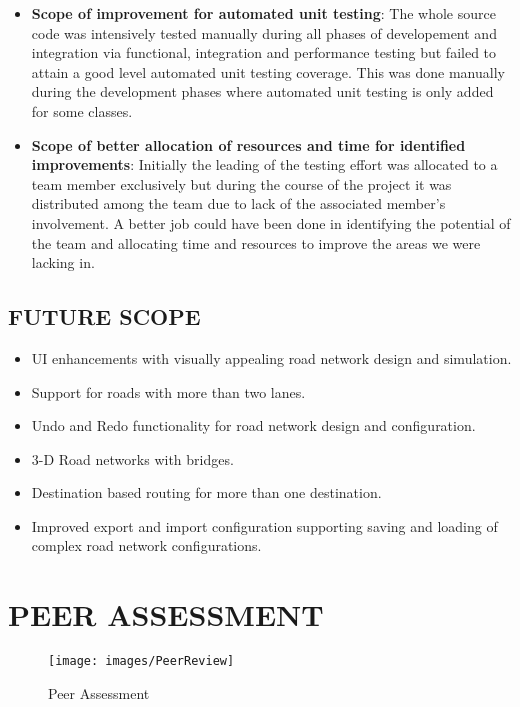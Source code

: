 \documentclass[11pt,a4paper]{article}
\begin{document}
	\begin{itemize}
		\item \textbf{Scope of improvement for automated unit testing}: The whole source code was intensively tested manually during all phases of developement and integration via functional, integration and performance testing but failed to attain a good level automated unit testing coverage. This was done manually during the development phases where automated unit testing is only added for some classes.
		\item \textbf{Scope of better allocation of resources and time for identified improvements}: Initially the leading of the testing effort was allocated to a team member exclusively but during the course of the project it was distributed among the team due to lack of the associated member's involvement. A better job could have been done in identifying the potential of the team and allocating time and resources to improve the areas we were lacking in.
	\end{itemize}

	
	\subsection{FUTURE SCOPE}
		\begin{itemize}
		\setlength\itemsep{0.2em}
			\item UI enhancements with visually appealing road network design and simulation.
			\item Support for roads with more than two lanes.			\item Undo and Redo functionality for road network design and configuration.
			\item 3-D Road networks with bridges.
			\item Destination based routing for more than one destination.
			\item Improved export and import configuration supporting saving and loading of complex road network configurations.
		\end{itemize}

\section{PEER ASSESSMENT}

\begin{figure}[h!]
			\texttt{[image: images/PeerReview]}
			\caption{Peer Assessment}
			\centering
		\end{figure}
\end{document}
